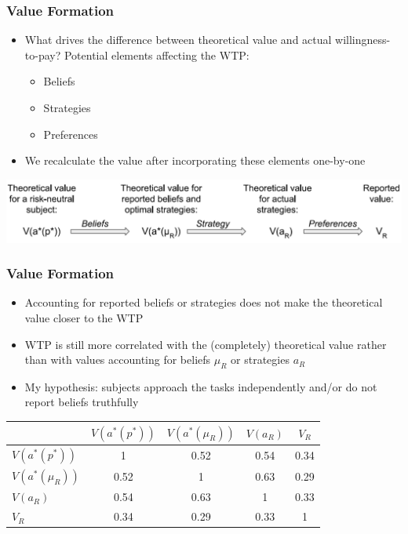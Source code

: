 \documentclass[11pt,hyperref={bookmarks=false}]{beamer}
\begin{document}
\begin{frame}
\frametitle{Value Formation}
\begin{itemize}
\item What drives the difference between theoretical value and actual willingness-to-pay? Potential elements affecting the WTP:
\begin{itemize}
\item Beliefs
\item Strategies
\item Preferences
\end{itemize}
\item We recalculate the value after incorporating these elements one-by-one
\end{itemize}
\includegraphics[scale=0.4]{value_diagram.png}
\end{frame}


\begin{frame}
\frametitle{Value Formation}
\begin{itemize}
\item Accounting for reported beliefs or strategies does not make the theoretical value closer to the WTP
\item WTP is still more correlated with the (completely) theoretical value rather than with values accounting for beliefs $\mu_R$ or strategies $a_R$
\item My hypothesis: subjects approach the tasks independently and/or do not report beliefs truthfully
\end{itemize}

\begin{table}[htbp]\centering

\begin{tabular}{l c c c c}
\hline\hline
           & $V(a^*(p^*))$ & $V(a^*(\mu_R))$   & $V(a_R)$ & $V_R$\\
\hline
$V(a^*(p^*))$ & 1 &   0.52 & 0.54 & 0.34\\
$V(a^*(\mu_R))$ & 0.52 & 1 & 0.63 & 0.29  \\
$V(a_R)$ & 0.54 & 0.63 & 1 & 0.33\\
$V_R$ & 0.34 & 0.29 & 0.33 & 1 \\

\hline
\end{tabular}
\end{table}

\end{frame}
\end{document}
